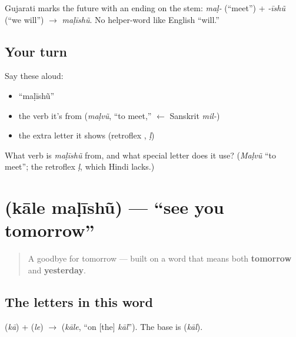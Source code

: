 \begin{grammarlens}[title={Grammar Lens: the future is an ending}]
Gujarati marks the future with an ending on the stem: \emph{maḷ-} (\textquotedblleft{}meet\textquotedblright{}) + \emph{-īshũ} (\textquotedblleft{}we will\textquotedblright{}) $\to$ \emph{maḷīshũ}. No helper-word like English \textquotedblleft{}will.\textquotedblright{}
\end{grammarlens}

\subsection*{Your turn}
Say these aloud:

\begin{itemize}
\raggedright
  \item \textquotedblleft{}maḷīshũ\textquotedblright{}
  \item the verb it's from (\emph{maḷvũ}, \textquotedblleft{}to meet,\textquotedblright{} $\leftarrow$ Sanskrit \emph{mil-})
  \item the extra letter it shows (retroflex , \emph{ḷ})
\end{itemize}

\begin{tcolorbox}[breakable,colback=teal!4,colframe=teal!35!black,title={Before you move on}]
What verb is \emph{maḷīshũ} from, and what special letter does it use? (\emph{Maḷvũ} \textquotedblleft{}to meet\textquotedblright{}; the retroflex  \emph{ḷ}, which Hindi lacks.)
\end{tcolorbox}
\section[\gu{કાલે} \gu{મળીશું}]{  (kāle maḷīshũ) — \textquotedblleft{}see you tomorrow\textquotedblright{}}

\label{lesson:GU-C04-kaale}



\begin{quote}
A goodbye for tomorrow — built on a word that means both \textbf{tomorrow} and \textbf{yesterday}.
\end{quote}

\subsection*{The letters in this word}
\textbf{} (\emph{kā}) + \textbf{} (\emph{le}) $\to$ \textbf{} (\emph{kāle}, \textquotedblleft{}on {[}the{]} \emph{kāl}\textquotedblright{}). The base is \textbf{} (\emph{kāl}).


